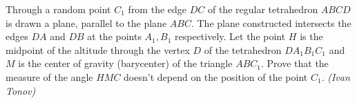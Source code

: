 Through a random point $C_1$ from the edge $DC$ of the regular tetrahedron $ABCD$ is drawn a plane, parallel to the plane $ABC$. The plane constructed intersects the edges $DA$ and $DB$ at the points $A_1,B_1$ respectively. Let the point $H$ is the midpoint of the altitude through the vertex $D$ of the tetrahedron $DA_1B_1C_1$ and $M$ is the center of gravity (barycenter) of the triangle $ABC_1$. Prove that the measure of the angle $HMC$ doesn’t depend on the position of the point $C_1$. \textit{(Ivan Tonov)}
